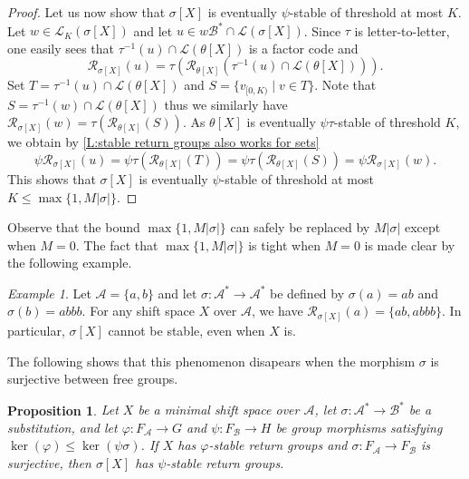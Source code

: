\documentclass{amsart}
\newcommand*{\ret}{\mathcal{R}}
\newcommand*{\lang}{\mathcal{L}}
\newcommand*{\cA}{\mathcal{A}}
\newcommand*{\cB}{\mathcal{B}}
\newcommand*{\from}{\colon}
\theoremstyle{plain}
\newtheorem{proposition}[theorem]{Proposition}
\theoremstyle{definition}
\theoremstyle{remark}
\newtheorem{example}[theorem]{Example}
\begin{document}
\begin{proof}
    Let us now show that $\sigma[X]$ is eventually $\psi$-stable of threshold at most $K$. Let $w \in \lang_K(\sigma[X])$ and let $u \in w\cB^* \cap \lang(\sigma[X])$. Since $\tau$ is letter-to-letter, one easily sees that $\tau^{-1}(u)\cap\lang(\theta[X])$ is a factor code and 
    \[
        \ret_{\sigma[X]}(u) = \tau(\ret_{\theta[X]}(\tau^{-1}(u)\cap\lang(\theta[X]))).
    \]
    Set $T = \tau^{-1}(u)\cap\lang(\theta[X])$ and $S = \{v_{[0,K)} \mid v \in T\}$. Note that $S = \tau^{-1}(w)\cap\lang(\theta[X])$ thus we similarly have $\ret_{\sigma[X]}(w) = \tau(\ret_{\theta[X]}(S))$. As $\theta[X]$ is eventually $\psi\tau$-stable of threshold $K$, we obtain by \cref{L:stable return groups also works for sets}
    \[
        \psi\ret_{\sigma[X]}(u) = \psi\tau(\ret_{\theta[X]}(T)) = \psi\tau(\ret_{\theta[X]}(S)) = \psi\ret_{\sigma[X]}(w).
    \]
    This shows that $\sigma[X]$ is eventually $\psi$-stable of threshold at most $K \leq \max\{1,M|\sigma|\}$.
\end{proof}

Observe that the bound $\max\{1,M|\sigma|\}$ can safely be replaced by $M|\sigma|$ except when $M=0$. The fact that $\max\{1,M|\sigma|\}$ is tight when $M=0$ is made clear by the following example.
\begin{example}
    Let $\cA = \{a,b\}$ and let $\sigma\from \cA^*\to\cA^*$ be defined by $\sigma(a) = ab$ and $\sigma(b) = abbb$. For any shift space $X$ over $\cA$, we have $\ret_{\sigma[X]}(a) = \{ab, abbb\}$. In particular, $\sigma[X]$ cannot be stable, even when $X$ is.
\end{example}

The following shows that this phenomenon disapears when the morphism $\sigma$ is surjective between free groups.

\begin{proposition}\label{P:stability preserved by substitution}
    Let $X$ be a minimal shift space over $\cA$, let $\sigma\from \cA^* \to \cB^*$ be a substitution, and let $\varphi\from F_\cA \to G$ and $\psi\from F_\cB \to H$ be group morphisms satisfying $\ker(\varphi) \leq \ker(\psi\sigma)$. If $X$ has $\varphi$-stable return groups and $\sigma\from F_\cA \to F_\cB$ is surjective, then $\sigma[X]$ has $\psi$-stable return groups.
\end{proposition}
\end{document}
